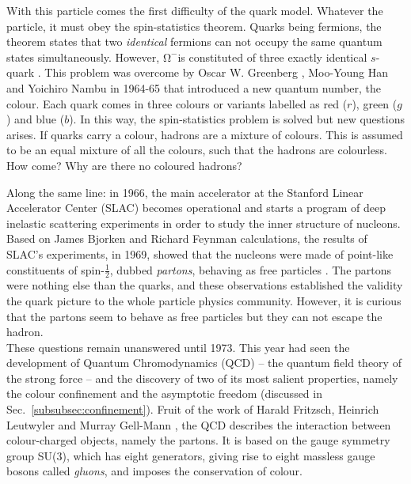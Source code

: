 \documentclass[ALICE,manyauthors]{cernphprep}
\newcommand{\Sec}       {\textsc{S}ec.~}
\newcommand{\rmOmegaM}  {\mbox{$\mathrm {\Omega^{-}}$}\space}
\providecommand{\DIFaddtex}[1]{{\protect\color{blue}\uwave{#1}}} %
\providecommand{\DIFaddbegin}{} %
\providecommand{\DIFaddend}{} %
\providecommand{\DIFadd}[1]{\texorpdfstring{\DIFaddtex{#1}}{#1}} %
\newcommand{\DIFaddincludegraphics}[2][]{{\color{blue}\fbox{\DIFOincludegraphics[#1]{#2}}}} %
\DeclareRobustCommand{\DIFaddbegin}{\DIFOaddbegin \let\includegraphics\DIFaddincludegraphics} %
\DeclareRobustCommand{\DIFaddend}{\DIFOaddend \let\includegraphics\DIFOincludegraphics} %
\begin{document}
With this particle comes the first difficulty of the quark model. Whatever the particle, it must obey the spin-statistics theorem. Quarks being fermions, the theorem states that two \textit{identical} fermions can not occupy the same quantum states simultaneously. However, \rmOmegaM is constituted of three exactly identical $s$-quark \cite{skandsIntroductionQCD2013}. This problem was overcome by Oscar W. Greenberg \cite{greenbergSpinUnitarySpinIndependence1964}, Moo-Young Han and Yoichiro Nambu \cite{hanThreeTripletModelDouble1965} in 1964-65 that introduced a new quantum number, the colour. Each quark comes in three colours or variants labelled as red ($r$), green ($g$) and blue ($b$). In this way, the spin-statistics problem is solved but new questions arises. If quarks carry a colour, hadrons are a mixture of colours. This is assumed to be an equal mixture of all the colours, such that the hadrons are colourless. How come? Why are there no coloured hadrons? 

Along the same line: in 1966, the main accelerator at the Stanford Linear Accelerator Center (SLAC) becomes operational and starts a program of deep inelastic scattering experiments in order to study the inner structure of nucleons. Based on James Bjorken\DIFaddbegin \DIFadd{'s }\DIFaddend \cite{bjorkenCurrentAlgebraSmall2018} and Richard Feynman\DIFaddbegin \DIFadd{'s  }\DIFaddend \cite{feynmanBehaviorHadronCollisions1988} calculations, the results of SLAC's experiments, in 1969, showed that the nucleons were made of point-like constituents of spin-$\frac{1}{2}$, dubbed \textit{partons}, behaving as free particles \cite{peskinIntroductionQuantumField2018}. The partons were nothing else than the quarks, and these observations established the validity the quark picture to the whole particle physics community. However, it is curious that the partons seem to behave as free particles but they can not escape the hadron.\\

These questions remain unanswered until 1973. This year had seen the development of Quantum Chromodynamics (QCD) -- the quantum field theory of the strong force -- and the discovery of two of its most salient properties, namely the colour confinement and the asymptotic freedom (discussed in \Sec\ref{subsubsec:confinement}). Fruit of the work of Harald Fritzsch, Heinrich Leutwyler and Murray Gell-Mann \cite{fritzschAdvantagesColorOctet1973}, the QCD describes the interaction between colour-charged objects, namely the partons. It is based on the gauge symmetry group SU(3), which has eight generators, giving rise to eight massless gauge bosons called \textit{gluons}, and imposes the conservation of colour. 
\end{document}
